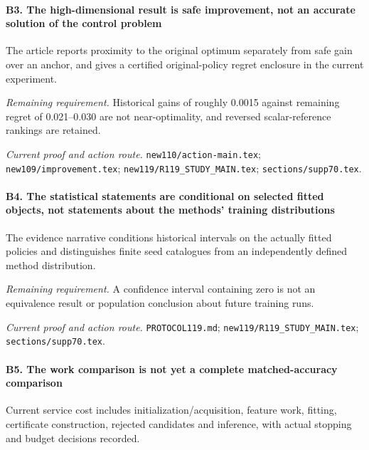 \paragraph{B3. The high-dimensional result is safe improvement, not an accurate solution of the control problem}

The article reports proximity to the original optimum separately from safe gain over an anchor, and gives a certified original-policy regret enclosure in the current experiment.

\par\emph{Remaining requirement.} Historical gains of roughly 0.0015 against remaining regret of 0.021--0.030 are not near-optimality, and reversed scalar-reference rankings are retained.

\par\emph{Current proof and action route.} \nolinkurl{new110/action-main.tex}; \nolinkurl{new109/improvement.tex}; \nolinkurl{new119/R119_STUDY_MAIN.tex}; \nolinkurl{sections/supp70.tex}.

\paragraph{B4. The statistical statements are conditional on selected fitted objects, not statements about the methods' training distributions}

The evidence narrative conditions historical intervals on the actually fitted policies and distinguishes finite seed catalogues from an independently defined method distribution.

\par\emph{Remaining requirement.} A confidence interval containing zero is not an equivalence result or population conclusion about future training runs.

\par\emph{Current proof and action route.} \nolinkurl{PROTOCOL119.md}; \nolinkurl{new119/R119_STUDY_MAIN.tex}; \nolinkurl{sections/supp70.tex}.

\paragraph{B5. The work comparison is not yet a complete matched-accuracy comparison}

Current service cost includes initialization/\allowbreak{}acquisition, feature work, fitting, certificate construction, rejected candidates and inference, with actual stopping and budget decisions recorded.

